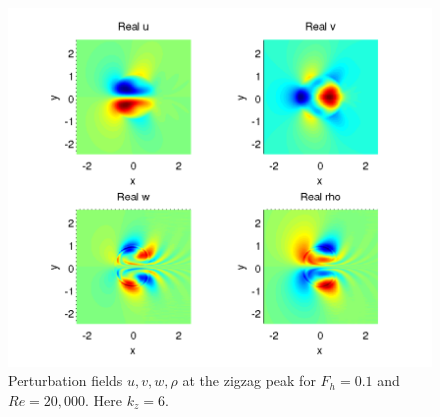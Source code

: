 \begin{figure}
\begin{center}
\includegraphics[width=\textwidth]{velocity_fields_kz_6}
\caption{Perturbation fields $u,v,w,\rho$ at the zigzag peak for $F_{h}=0.1$ and $Re=20{,}000$. Here $k_{z}=6$.}
\label{zigzag_fields} 
\end{center}
\end{figure} 


